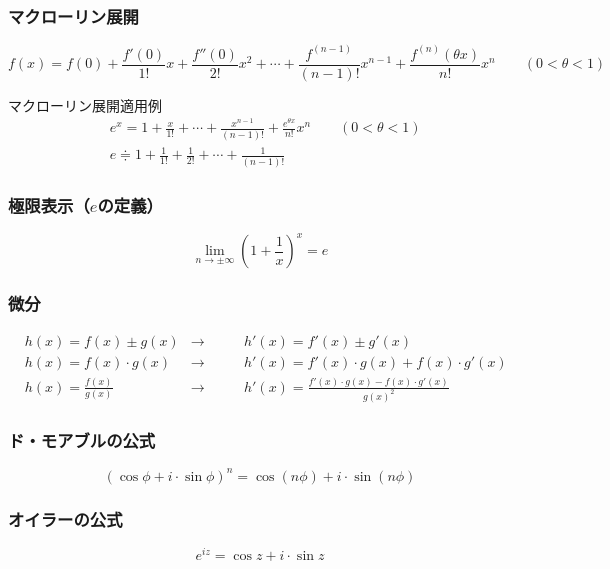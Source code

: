 \documentclass[a4paper,10pt]{jsarticle}
\begin{document}
\subsubsection{マクローリン展開}
\begin{equation}
f(x)=f(0)+\frac{f'(0)}{1!}x+\frac{f''(0)}{2!}x^2+\cdots+\frac{f^{(n-1)}}{(n-1)!}x^{n-1}+\frac{f^{(n)}(\theta x)}{n!}x^n \qquad (0<\theta<1)
\end{equation}

マクローリン展開適用例
\begin{align}
&e^x=1+\frac{x}{1!}+\cdots+\frac{x^{n-1}}{(n-1)!}+\frac{e^{\theta x}}{n!}x^n \qquad (0<\theta<1) \\
&e\doteqdot 1+\frac{1}{1!}+\frac{1}{2!}+\cdots+\frac{1}{(n-1)!}
\end{align}


\subsubsection{極限表示（$e$の定義）}
\begin{equation}
\lim_{n\to\pm\infty}\left(1+\frac{1}{x}\right)^x=e
\end{equation}


\subsubsection{微分}
\begin{align}
&h(x)=f(x)\pm g(x)      & \to \qquad & h'(x)=f'(x)\pm g'(x) \\
&h(x)=f(x)\cdot g(x)    & \to \qquad & h'(x)=f'(x)\cdot g(x)+f(x)\cdot g'(x) \\
&h(x)=\frac{f(x)}{g(x)} & \to \qquad & h'(x)=\frac{f'(x)\cdot g(x)-f(x)\cdot g'(x)}{g(x)^2}
\end{align}


\subsubsection{ド・モアブルの公式}
\begin{equation}
(\cos\phi+i\cdot\sin\phi)^n=\cos(n\phi)+i\cdot\sin(n\phi)
\end{equation}


\subsubsection{オイラーの公式}
\begin{equation}
e^{i z}=\cos z+i\cdot\sin z
\end{equation}
\end{document}
